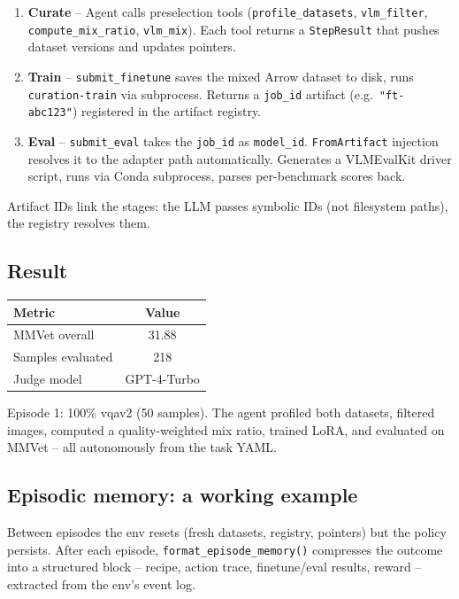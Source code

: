 \begin{enumerate}
    \item \textbf{Curate} -- Agent calls preselection tools (\texttt{profile\_datasets}, \texttt{vlm\_filter}, \texttt{compute\_mix\_ratio}, \texttt{vlm\_mix}).
        Each tool returns a \texttt{StepResult} that pushes dataset versions and updates pointers.
    \item \textbf{Train} -- \texttt{submit\_finetune} saves the mixed Arrow dataset to disk, runs \texttt{curation-train} via subprocess.
        Returns a \texttt{job\_id} artifact (e.g.\ \texttt{"ft-abc123"}) registered in the artifact registry.
    \item \textbf{Eval} -- \texttt{submit\_eval} takes the \texttt{job\_id} as \texttt{model\_id}.
        \texttt{FromArtifact} injection resolves it to the adapter path automatically.
        Generates a VLMEvalKit driver script, runs via Conda subprocess, parses per-benchmark scores back.
\end{enumerate}

\noindent Artifact IDs link the stages: the LLM passes symbolic IDs (not filesystem paths), the registry resolves them.

\subsection{Result}

\begin{table}[H]
\centering
\begin{tabular}{lc}
\toprule
\textbf{Metric} & \textbf{Value} \\
\midrule
MMVet overall & 31.88 \\
Samples evaluated & 218 \\
Judge model & GPT-4-Turbo \\
\bottomrule
\end{tabular}
\end{table}

\noindent Episode 1: 100\% vqav2 (50 samples). The agent profiled both datasets, filtered images, computed a quality-weighted mix ratio, trained LoRA, and evaluated on MMVet -- all autonomously from the task YAML.

\subsection{Episodic memory: a working example}

Between episodes the env resets (fresh datasets, registry, pointers) but the policy persists.
After each episode, \texttt{format\_episode\_memory()} compresses the outcome into a structured block -- recipe, action trace, finetune/eval results, reward -- extracted from the env's event log.

